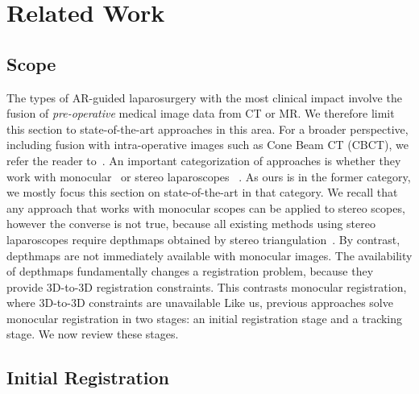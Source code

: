 
\section{Related Work}
\label{sec:sota}
\subsection{Scope}
The types of AR-guided laparosurgery with the most clinical impact involve the fusion of \emph{pre-operative} medical image data from CT or MR. We therefore limit this section to state-of-the-art approaches in this area. For a broader perspective, including fusion with intra-operative images such as Cone Beam CT (CBCT), we refer the reader to~\cite{Bernhardt2017}. An important categorization of approaches is whether they work with monocular~\cite{affineTracking} or stereo laparoscopes ~\cite{21142942,conf/miccai/Amir-KhaliliNPHA13,Cohen2010Prostate,hamarneh2014igrs,haouchine13,Su2009}. As ours is in the former category, we mostly focus this section on state-of-the-art in that category. We recall that any approach that works with monocular scopes can be applied to stereo scopes, however the converse is not true, because all existing
methods using stereo laparoscopes require depthmaps obtained by stereo triangulation~\cite{DBLP:conf/miccai/StoyanovSPY10}. By contrast, depthmaps are not immediately available with monocular images. %
The availability of depthmaps fundamentally changes a registration problem, because they provide 3D-to-3D registration constraints. This contrasts monocular registration, where 3D-to-3D constraints are unavailable
Like us, previous approaches solve monocular registration in two stages: an initial registration stage and a tracking stage. We now review these stages.

\subsection{Initial Registration}

